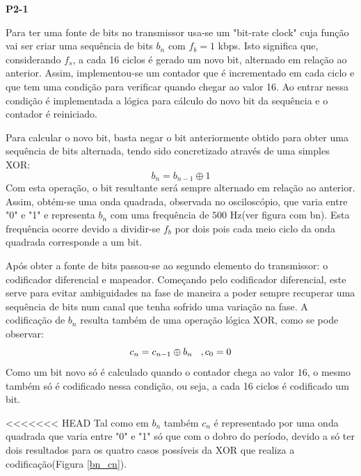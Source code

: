 \documentclass[11pt]{article}
\begin{document}
\vspace{2 mm}

\textbf{P2-1}

Para ter uma fonte de bits no transmissor usa-se um "bit-rate clock" cuja função vai ser criar uma sequência de bits $ b_n $ com $f_b=1$ kbps. Isto significa que, considerando $f_s$, a cada 16 ciclos é gerado um novo bit, alternado em relação ao anterior. Assim, implementou-se um contador que é incrementado em cada ciclo  e que tem uma condição para verificar quando chegar ao valor 16. Ao entrar nessa condição é implementada a lógica para cálculo do novo bit da sequência e o contador é reiniciado.

Para calcular o novo bit, basta negar o bit anteriormente obtido para obter uma sequência de bits alternada, tendo sido concretizado através de uma simples XOR:
\begin{equation}
b_n=b_{n-1} \oplus 1
\end{equation}
Com esta operação, o bit resultante será sempre alternado em relação ao anterior.
Assim, obtém-se uma onda quadrada, observada no osciloscópio, que varia entre "0" e "1" e representa $ b_n $  com uma frequência de $500$ Hz(ver figura com bn). Esta frequência ocorre devido a dividir-se  $f_b$ por dois pois cada meio ciclo da onda quadrada corresponde a um bit.  
\vspace{2 mm}

Após obter a fonte de bits passou-se ao segundo elemento do transmissor: o codificador diferencial e mapeador. Começando pelo codificador diferencial, este serve para evitar ambiguidades na fase de maneira a poder sempre recuperar uma sequência de bits num canal que tenha sofrido uma variação na fase.
A codificação de $b_n$ resulta também de uma operação lógica XOR, como se pode observar: 
\begin{equation}
c_n=c_{n-1} \oplus b_n \hspace{3 mm} ,c_0=0
\end{equation}
Como um bit novo só é calculado quando o contador chega ao valor $16$, o mesmo também só é codificado nessa condição, ou seja, a cada 16 ciclos é codificado um bit. 

<<<<<<< HEAD
Tal como em $ b_n $ também $ c_n $ é representado por uma onda quadrada que varia entre "0" e "1" só que com o dobro do período, devido a só ter dois resultados para os quatro casos possíveis da XOR que realiza a codificação(Figura \ref{bn_cn}).
\end{document}
